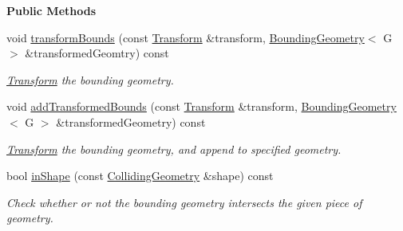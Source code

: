 \begin{Indent}\textbf{ Public Methods}\par
\begin{DoxyCompactItemize}
\item 
\mbox{\label{classrev_1_1_bounding_geometry_ad0883bd4d3a842b5f1d3b1b3593fd0c3}} 
void \mbox{\hyperlink{classrev_1_1_bounding_geometry_ad0883bd4d3a842b5f1d3b1b3593fd0c3}{transform\+Bounds}} (const \mbox{\hyperlink{classrev_1_1_transform}{Transform}} \&transform, \mbox{\hyperlink{classrev_1_1_bounding_geometry}{Bounding\+Geometry}}$<$ G $>$ \&transformed\+Geomtry) const
\begin{DoxyCompactList}\small\item\em \mbox{\hyperlink{classrev_1_1_transform}{Transform}} the bounding geometry. \end{DoxyCompactList}\item 
\mbox{\label{classrev_1_1_bounding_geometry_a5677c130bf9778b78468ce307d01983e}} 
void \mbox{\hyperlink{classrev_1_1_bounding_geometry_a5677c130bf9778b78468ce307d01983e}{add\+Transformed\+Bounds}} (const \mbox{\hyperlink{classrev_1_1_transform}{Transform}} \&transform, \mbox{\hyperlink{classrev_1_1_bounding_geometry}{Bounding\+Geometry}}$<$ G $>$ \&transformed\+Geometry) const
\begin{DoxyCompactList}\small\item\em \mbox{\hyperlink{classrev_1_1_transform}{Transform}} the bounding geometry, and append to specified geometry. \end{DoxyCompactList}\item 
\mbox{\label{classrev_1_1_bounding_geometry_a6896f545f872ab5c66a8653d7d68bd8e}} 
bool \mbox{\hyperlink{classrev_1_1_bounding_geometry_a6896f545f872ab5c66a8653d7d68bd8e}{in\+Shape}} (const \mbox{\hyperlink{classrev_1_1_colliding_geometry}{Colliding\+Geometry}} \&shape) const
\begin{DoxyCompactList}\small\item\em Check whether or not the bounding geometry intersects the given piece of geometry. \end{DoxyCompactList}\item 
\mbox{\label{classrev_1_1_bounding_geometry_a3b91ed09857844e5b56a59e3b2f79e51}} 

\end{DoxyCompactItemize}
\end{Indent}
